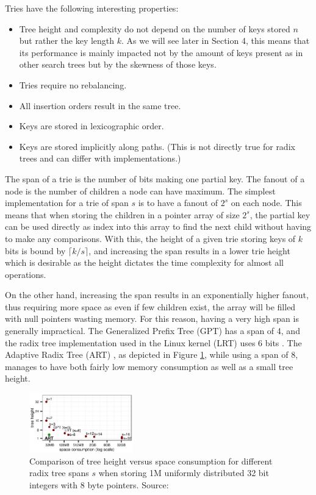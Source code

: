 \documentclass[acmtog, nonacm]{acmart}
\begin{document}
Tries have the following interesting properties:
\begin{itemize}
    \item Tree height and complexity do not depend on the number of keys stored $n$ but rather
    the key length $k$. As we will see later in Section 4, this means that its performance is mainly impacted not by
    the amount of keys present as in other search trees but by the skewness of those keys.
    \item Tries require no rebalancing.
    \item All insertion orders result in the same tree.
    \item Keys are stored in lexicographic order.
    \item Keys are stored implicitly along paths. (This is not directly true for radix trees and can differ with implementations.)
\end{itemize}

The span of a trie is the number of bits making one partial key. The fanout of a node is the number of children 
a node can have maximum. The simplest implementation for a trie of span $s$ is to have a fanout of $2^s$ on 
each node. This means that when storing the children in a pointer array of size $2^s$, the partial key can be used 
directly as index into this array to find the next child without having to make any comparisons.
With this, the height of a given trie storing keys of $k$ bits is bound by $\lceil k/s\rceil$, and increasing 
the span results in a lower trie height which is desirable as the height dictates the time complexity for almost 
all operations.

On the other hand, increasing the span results in an exponentially higher fanout, thus requiring more space as even 
if few children exist, the array will be filled with null pointers wasting memory. 
For this reason, having a very high span is generally impractical. The Generalized Prefix Tree (GPT) \cite{mci/Boehm2011} 
has a span of 4, and the radix tree implementation used in the Linux kernel (LRT) uses 6 bits \cite{corbet2006lrt}. 
The Adaptive Radix Tree (ART) \cite{6544812}, as depicted in Figure \ref{fig:trie-mem}, while using a span of 8, manages to have both 
fairly low memory consumption as well as a small tree height.

\begin{figure}
    \centering
    \includegraphics[width=0.4\textwidth]{images/02-trie-memory-consumption.png}
    \caption{Comparison of tree height versus space consumption for different radix tree spans $s$ when storing 1M uniformly distributed 32 bit integers with 8 byte pointers.
    Source: \cite{6544812}}
    \label{fig:trie-mem}
\end{figure}
\end{document}
